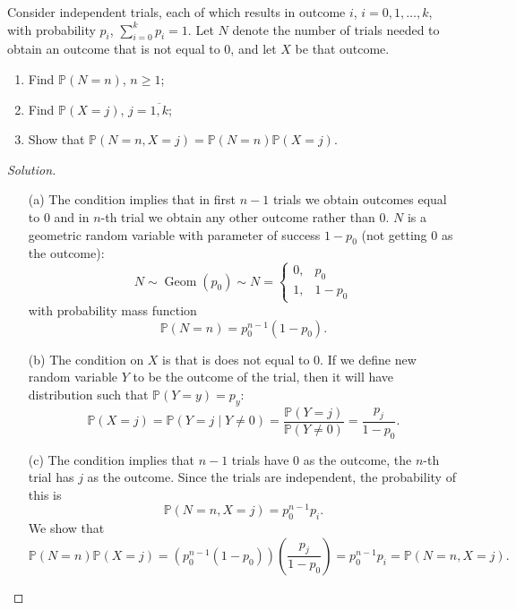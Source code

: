 \documentclass{article}[12pt]
\newenvironment{solution}
  {\renewcommand\qedsymbol{$\blacksquare$}\begin{proof}[Solution]}
  {\end{proof}}
\newenvironment{problem}[1]
  {\renewcommand\theinnercustomprblm{#1}\innercustomprblm}
  {\endinnercustomprblm}
\DeclareMathOperator{\Geo}{Geom}
\renewcommand{\P}{\mathbb{P}}
\begin{document}
\begin{problem}{6.24(a-c)}\normalfont
Consider independent trials, each of which results in outcome $i$, $i=0,1,\ldots,k$, with probability $p_{i}$, $\sum_{i=0}^{k}p_{i} = 1$.
Let $N$ denote the number of trials needed to obtain an outcome that is not equal to $0$, and let $X$ be that outcome.
\begin{enumerate}[label=(\alph*)]
    \item Find $\P(N = n)$, $n \geqslant 1$;
    \item Find $\P(X = j)$, $j = \overline{1,k}$;
    \item Show that $\P(N = n, X = j) = \P(N = n)\P(X = j)$.
\end{enumerate}
\end{problem}
\begin{solution}
\text{}
\begin{enumerate}
    \item[(a)] The condition implies that in first $n-1$ trials we obtain outcomes equal to $0$ and in $n$-th trial we obtain any other outcome rather than $0$.
    $N$ is a geometric random variable with parameter of success $1 - p_{0}$ (not getting $0$ as the outcome):
    \begin{equation*}
        N\sim\Geo(p_{0})\sim N =\begin{cases} 0, & p_{0} \\ 1, & 1- p_{0}\end{cases}
    \end{equation*}
    with probability mass function
    \begin{equation*}
        \P(N = n) = p_{0}^{n-1}(1 - p_{0}).
    \end{equation*}
    \item[(b)] The condition on $X$ is that is does not equal to $0$.
    If we define new random variable $Y$ to be the outcome of the trial, then it will have distribution such that $\P(Y = y) = p_{y}$:
    \begin{equation*}
        \P(X = j) =\P(Y = j\mid Y\neq 0) = \frac{\P(Y = j)}{\P(Y\neq 0)} = \frac{p_{j}}{1 - p_{0}}.
    \end{equation*}
    \item[(c)] The condition implies that $n-1$ trials have $0$ as the outcome, the $n$-th trial has $j$ as the outcome.
    Since the trials are independent, the probability of this is
    \begin{equation*}
        \P(N = n, X = j) = p_{0}^{n-1}p_{i}.
    \end{equation*}
    We show that
    \begin{equation*}
        \P(N = n)\P(X = j) = \left(p_{0}^{n-1}(1 - p_{0})\right)\left(\frac{p_{j}}{1 - p_{0}}\right) = p_{0}^{n-1}p_{i} = \P(N = n, X = j).
    \end{equation*}
\end{enumerate}
\end{solution}
\end{document}
